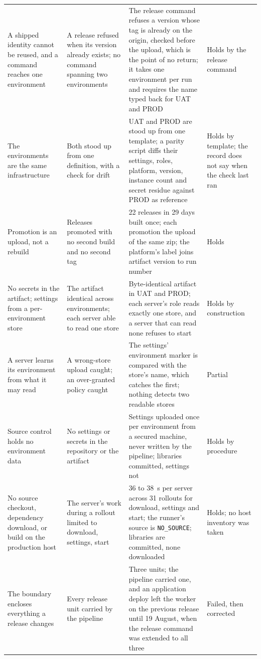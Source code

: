 \documentclass[11pt]{article}
\begin{document}
{\begin{xltabular}{\textwidth}{@{}p{0.2\textwidth}YYp{0.15\textwidth}@{}}
A shipped identity cannot be reused, and a command reaches one environment & A release refused when its version already exists; no command spanning two environments & The release command refuses a version whose tag is already on the origin, checked before the upload, which is the point of no return; it takes one environment per run and requires the name typed back for UAT and PROD & Holds by the release command \\
The environments are the same infrastructure & Both stood up from one definition, with a check for drift & UAT and PROD are stood up from one template; a parity script diffs their settings, roles, platform, version, instance count and secret residue against PROD as reference & Holds by template; the record does not say when the check last ran \\
Promotion is an upload, not a rebuild & Releases promoted with no second build and no second tag & 22 releases in 29 days built once; each promotion the upload of the same zip; the platform's label joins artifact version to run number & Holds \\
No secrets in the artifact; settings from a per-environment store & The artifact identical across environments; each server able to read one store & Byte-identical artifact in UAT and PROD; each server's role reads exactly one store, and a server that can read none refuses to start & Holds by construction \\
A server learns its environment from what it may read & A wrong-store upload caught; an over-granted policy caught & The settings' environment marker is compared with the store's name, which catches the first; nothing detects two readable stores & Partial \\
Source control holds no environment data & No settings or secrets in the repository or the artifact & Settings uploaded once per environment from a secured machine, never written by the pipeline; libraries committed, settings not & Holds by procedure \\
No source checkout, dependency download, or build on the production host & The server's work during a rollout limited to download, settings, start & 36 to 38~s per server across 31 rollouts for download, settings and start; the runner's source is \texttt{NO\_SOURCE}; libraries are committed, none downloaded & Holds; no host inventory was taken \\
The boundary encloses everything a release changes & Every release unit carried by the pipeline & Three units; the pipeline carried one, and an application deploy left the worker on the previous release until 19 August, when the release command was extended to all three & Failed, then corrected \\

\end{xltabular}}
\end{document}
